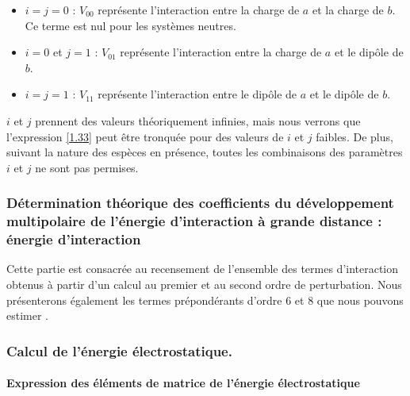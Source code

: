 	\begin{itemize}
		\item $i=j=0$ : $V_{00}$ représente l'interaction entre la charge de $a$ et la charge de $b$. Ce terme est nul pour les systèmes neutres. 	
		\item $i=0$ et $j=1$ : $V_{01}$ représente l'interaction entre la charge de $a$ et le dipôle de $b$. 	
		\item $i=j=1$ : $V_{11}$ représente l'interaction entre le dipôle de $a$ et le dipôle de $b$.
	\end{itemize}
	
	$i$ et $j$ prennent des valeurs théoriquement infinies, mais nous verrons que l'expression \ref{1.33} peut être tronquée pour des valeurs de $i$ et $j$ faibles. De plus, suivant la nature des espèces en présence, toutes les combinaisons des paramètres $i$ et $j$ ne sont pas permises.
	
	
	
	\subsubsection{Détermination théorique des coefficients du développement multipolaire de l’énergie d'interaction à grande distance : énergie d’interaction}
	
	
	Cette partie est consacrée au recensement de l'ensemble des termes d'interaction obtenus à partir d'un calcul au premier et au second ordre de perturbation. Nous présenterons également les termes prépondérants d'ordre 6 et 8 que nous pouvons estimer \cite{saute1982calculated}.
	
	\subsubsection{Calcul de l’énergie électrostatique.}
	
	\paragraph{Expression des éléments de matrice de l'énergie électrostatique}
	
